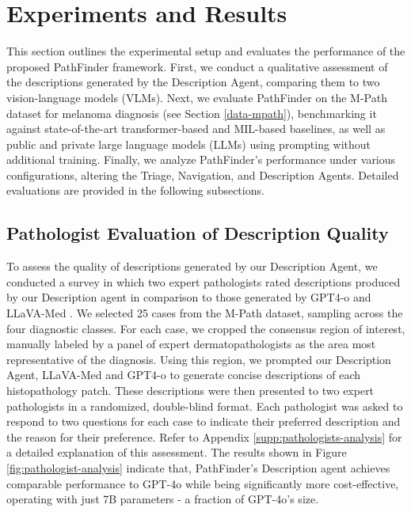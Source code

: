 \section{Experiments and Results}


This section outlines the experimental setup and evaluates the performance of the proposed PathFinder framework. First, we conduct a qualitative assessment of the descriptions generated by the Description Agent, comparing them to two vision-language models (VLMs). Next, we evaluate PathFinder on the M-Path dataset for melanoma diagnosis (see Section \ref{data-mpath}), benchmarking it against state-of-the-art transformer-based and MIL-based baselines, as well as public and private large language models (LLMs) using prompting without additional training. Finally, we analyze PathFinder's performance under various configurations, altering the Triage, Navigation, and Description Agents. Detailed evaluations are provided in the following subsections.


\subsection{Pathologist Evaluation of Description Quality}
\label{sup:pathologist-analysis}




To assess the quality of descriptions generated by our Description Agent, we conducted a survey in which two expert pathologists rated descriptions produced by our Description agent in comparison to those generated by GPT4-o \cite{hurst2024gpt} and LLaVA-Med \cite{li2024llava}. We selected 25 cases from the M-Path dataset, sampling across the four diagnostic classes. For each case, we cropped the consensus region of interest, manually labeled by a panel of expert dermatopathologists as the area most representative of the diagnosis. Using this region, we prompted our Description Agent, LLaVA-Med and GPT4-o to generate concise descriptions of each histopathology patch. These descriptions were then presented to two expert pathologists in a randomized, double-blind format. Each pathologist was asked to respond to two questions for each case to indicate their preferred description and the reason for their preference. Refer to Appendix \ref{supp:pathologists-analysis} for a detailed explanation of this assessment. The results shown in Figure \ref{fig:pathologist-analysis} indicate that, PathFinder's Description agent achieves comparable performance to GPT-4o while being significantly more cost-effective, operating with just 7B parameters - a fraction of GPT-4o's size.

